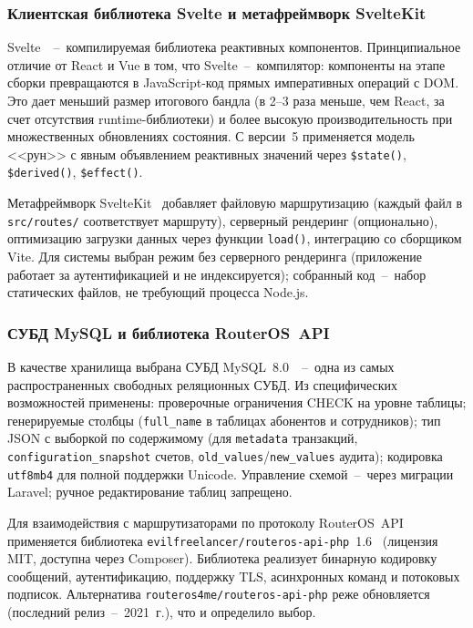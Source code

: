 \subsubsection{Клиентская библиотека Svelte и метафреймворк SvelteKit}

Svelte~\cite{sveltedoc}~--~компилируемая библиотека реактивных компонентов. Принципиальное отличие от React и Vue в том, что Svelte~--~компилятор: компоненты на этапе сборки превращаются в JavaScript-код прямых императивных операций с DOM. Это дает меньший размер итогового бандла (в 2--3 раза меньше, чем React, за счет отсутствия runtime-библиотеки) и более высокую производительность при множественных обновлениях состояния. С версии~5 применяется модель <<рун>> с явным объявлением реактивных значений через \texttt{\$state()}, \texttt{\$derived()}, \texttt{\$effect()}.

Метафреймворк SvelteKit~\cite{sveltekitdoc} добавляет файловую маршрутизацию (каждый файл в \texttt{src/routes/} соответствует маршруту), серверный рендеринг (опционально), оптимизацию загрузки данных через функции \texttt{load()}, интеграцию со сборщиком Vite. Для системы выбран режим без серверного рендеринга (приложение работает за аутентификацией и не индексируется); собранный код~--~набор статических файлов, не требующий процесса Node.js.

\subsubsection{СУБД MySQL и библиотека RouterOS~API}

В качестве хранилища выбрана СУБД MySQL~8.0~\cite{mysqldoc}~--~одна из самых распространенных свободных реляционных СУБД. Из специфических возможностей применены: проверочные ограничения CHECK на уровне таблицы; генерируемые столбцы (\texttt{full\_name} в таблицах абонентов и сотрудников); тип JSON с выборкой по содержимому (для \texttt{metadata} транзакций, \texttt{configuration\_snapshot} счетов, \texttt{old\_values}/\texttt{new\_values} аудита); кодировка \texttt{utf8mb4} для полной поддержки Unicode. Управление схемой~--~через миграции Laravel; ручное редактирование таблиц запрещено.

Для взаимодействия с маршрутизаторами по протоколу RouterOS~API применяется библиотека \texttt{evilfreelancer/routeros-api-php}~1.6~\cite{routerosphp} (лицензия MIT, доступна через Composer). Библиотека реализует бинарную кодировку сообщений, аутентификацию, поддержку TLS, асинхронных команд и потоковых подписок. Альтернатива \texttt{routeros4me/routeros-api-php} реже обновляется (последний релиз~--~2021~г.), что и определило выбор.

